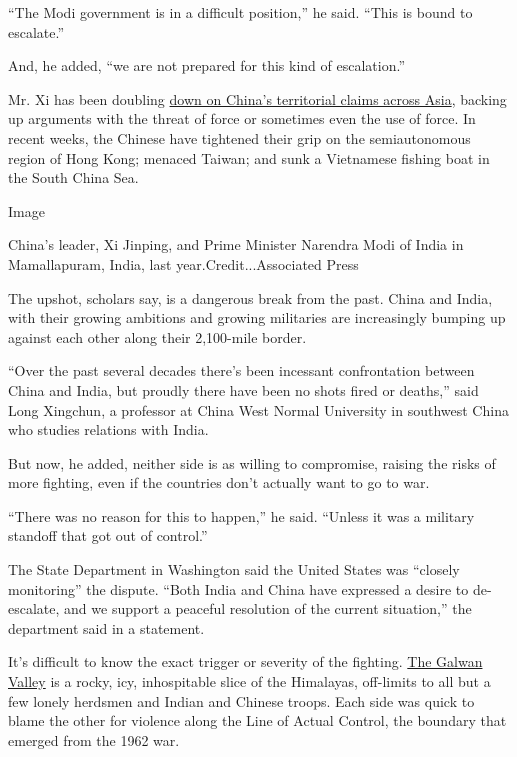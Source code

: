``The Modi government is in a difficult position,'' he said. ``This is
bound to escalate.''

And, he added, ``we are not prepared for this kind of escalation.''

Mr. Xi has been doubling
\href{https://www.nytimes.com/2020/05/24/world/asia/china-hong-kong-taiwan.html}{down
on China's territorial claims across Asia}, backing up arguments with
the threat of force or sometimes even the use of force. In recent weeks,
the Chinese have tightened their grip on the semiautonomous region of
Hong Kong; menaced Taiwan; and sunk a Vietnamese fishing boat in the
South China Sea.

Image

China's leader, Xi Jinping, and Prime Minister Narendra Modi of India in
Mamallapuram, India, last year.Credit...Associated Press

The upshot, scholars say, is a dangerous break from the past. China and
India, with their growing ambitions and growing militaries are
increasingly bumping up against each other along their 2,100-mile
border.

``Over the past several decades there's been incessant confrontation
between China and India, but proudly there have been no shots fired or
deaths,'' said Long Xingchun, a professor at China West Normal
University in southwest China who studies relations with India.

But now, he added, neither side is as willing to compromise, raising the
risks of more fighting, even if the countries don't actually want to go
to war.

``There was no reason for this to happen,'' he said. ``Unless it was a
military standoff that got out of control.''

The State Department in Washington said the United States was ``closely
monitoring'' the dispute. ``Both India and China have expressed a desire
to de-escalate, and we support a peaceful resolution of the current
situation,'' the department said in a statement.

It's difficult to know the exact trigger or severity of the fighting.
\href{https://www.indiatoday.in/india/story/india-china-border-faceoff-exclusive-maps-pangong-tso-ladakh-galwan-1688727-2020-06-13}{The
Galwan Valley} is a rocky, icy, inhospitable slice of the Himalayas,
off-limits to all but a few lonely herdsmen and Indian and Chinese
troops. Each side was quick to blame the other for violence along the
Line of Actual Control, the boundary that emerged from the 1962 war.

